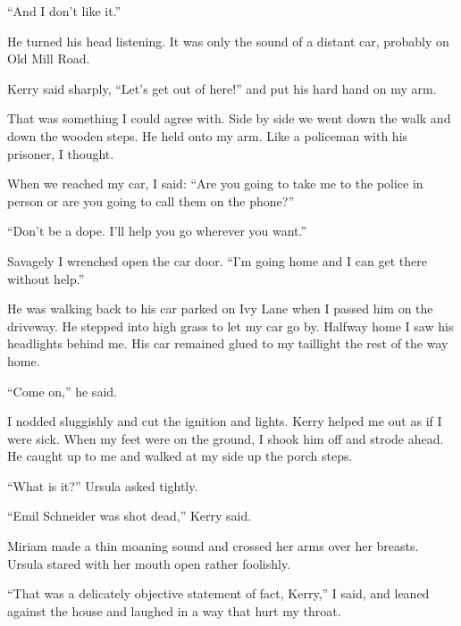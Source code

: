 \documentclass{novel}
\begin{document}
“And I don’t like it.”

He turned his head listening. It was only the sound of a distant car, probably on Old Mill Road.

Kerry said sharply, “Let’s get out of here!” and put his hard hand on my arm.

That was something I could agree with. Side by side we went down the walk and down the wooden steps. He held onto my arm. Like a policeman with his prisoner, I thought.

When we reached my car, I said: “Are you going to take me to the police in person or are you going to call them on the phone?”

“Don’t be a dope. I’ll help you go wherever you want.”

Savagely I wrenched open the car door. “I’m going home and I can get there without help.”

He was walking back to his car parked on Ivy Lane when I passed him on the driveway. He stepped into high grass to let my car go by. Halfway home I saw his headlights behind me. His car remained glued to my taillight the rest of the way home.

\vspace{2\nbs}
\clearpage
\thispagestyle{empty}
\begin{ChapterStart}
\vspace{3\nbs}
\end{ChapterStart}

“Come on,” he said.

I nodded sluggishly and cut the ignition and lights. Kerry helped me out as if I were sick. When my feet were on the ground, I shook him off and strode ahead. He caught up to me and walked at my side up the porch steps.

“What is it?” Ursula asked tightly.

“Emil Schneider was shot dead,” Kerry said.

Miriam made a thin moaning sound and crossed her arms over her breasts. Ursula stared with her mouth open rather foolishly.

“That was a delicately objective statement of fact, Kerry,” I said, and leaned against the house and laughed in a way that hurt my throat.
\end{document}
